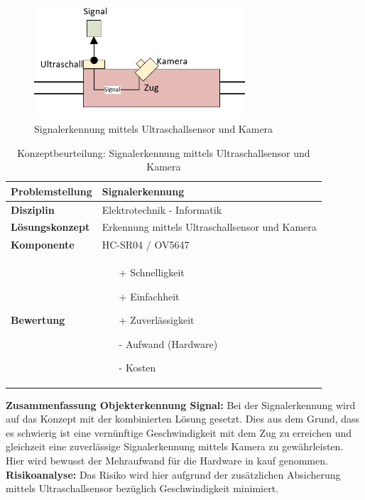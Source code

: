 \documentclass[../../../main.tex]{subfiles}
\begin{document}
    \begin{figure}[H]
        \centering
        \includegraphics[width=0.7\textwidth]{signal_kombi.png}
        \caption{Signalerkennung mittels Ultraschallsensor und Kamera}
    \end{figure}

    \vspace{1cm}
    \begin{flushleft}
        \begin{table}[H]
        \begin{tabular}{ | l | p{11cm} |}
        \hline
        \textbf{Problemstellung} & Signalerkennung \\ \hline
        \textbf{Disziplin} & Elektrotechnik - Informatik \\ \hline
        \textbf{Lösungskonzept} & Erkennung mittels Ultraschallsensor und Kamera \\ \hline
        \textbf{Komponente} & HC-SR04 / OV5647 \\ \hline
        \textbf{Bewertung} &  \begin{itemize}
                                \item[+] Schnelligkeit
                                \item[+] Einfachheit
                                \item[+] Zuverlässigkeit
                                \item[-] Aufwand (Hardware)   
                                \item[-] Kosten 
                              \end{itemize} \\ \hline
        \end{tabular}
        \caption{Konzeptbeurteilung: Signalerkennung mittels Ultraschallsensor und Kamera}
        \label{tab:konzept_wurfel_Stereokamera}
    \end{table}
    \end{flushleft}

    \textbf{Zusammenfassung Objekterkennung Signal:}
    Bei der Signalerkennung wird auf das Konzept mit der kombinierten Lösung gesetzt. Dies aus dem Grund, dass es schwierig ist eine vernünftige Geschwindigkeit mit dem Zug zu erreichen und gleichzeit eine zuverlässige Signalerkennung mittels Kamera zu gewährleisten. Hier wird bewusst der Mehraufwand für die Hardware in kauf genommen.
    \textbf{Risikoanalyse:}
    Das Risiko wird hier aufgrund der zusätzlichen Absicherung mittels Ultraschallsensor bezüglich Geschwindigkeit minimiert.
\end{document}
